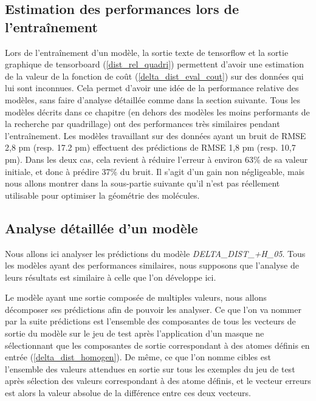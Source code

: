 \label{delta_dist_resultats}

\subsection{Estimation des performances lors de l'entraînement}

\label{delta_dist_estim_perf}

Lors de l'entraînement d'un modèle, la sortie texte de tensorflow et la sortie graphique de tensorboard (\ref{dist_rel_quadri}) permettent d'avoir une estimation de la valeur de la fonction de coût (\ref{delta_dist_eval_cout}) sur des données qui lui sont inconnues. Cela permet d'avoir une idée de la performance relative des modèles, sans faire d'analyse détaillée comme dans la section suivante. Tous les modèles décrits dans ce chapitre (en dehors des modèles les moins performants de la recherche par quadrillage) ont des performances très similaires pendant l'entraînement. Les modèles travaillant sur des données ayant un bruit de RMSE  2,8 pm (resp. 17.2 pm) effectuent des prédictions de RMSE 1,8 pm (resp. 10,7 pm). Dans les deux cas, cela revient à réduire l'erreur à environ 63\% de sa valeur initiale, et donc à prédire 37\% du bruit. Il s'agit d'un gain non négligeable, mais nous allons montrer dans la sous-partie suivante qu'il n'est pas réellement utilisable pour optimiser la géométrie des molécules.

\subsection{Analyse détaillée d'un modèle}

\par Nous allons ici analyser les prédictions du modèle \emph{DELTA\_DIST\_+H\_05}. Tous les modèles ayant des performances similaires, nous supposons que l'analyse de leurs résultats est similaire à celle que l'on développe ici.

\par Le modèle ayant une sortie composée de multiples valeurs, nous allons décomposer ses prédictions afin de pouvoir les analyser. Ce que l'on va nommer par la suite prédictions est l'ensemble des composantes de tous les vecteurs de sortie du modèle sur le jeu de test après l'application d'un masque ne sélectionnant que les composantes de sortie correspondant à des atomes définis en entrée (\ref{delta_dist_homogen}). De même, ce que l'on nomme cibles est l'ensemble des valeurs attendues en sortie sur tous les exemples du jeu de test après sélection des valeurs correspondant à des atome définis, et le vecteur erreurs est alors la valeur absolue de la différence entre ces deux vecteurs.

